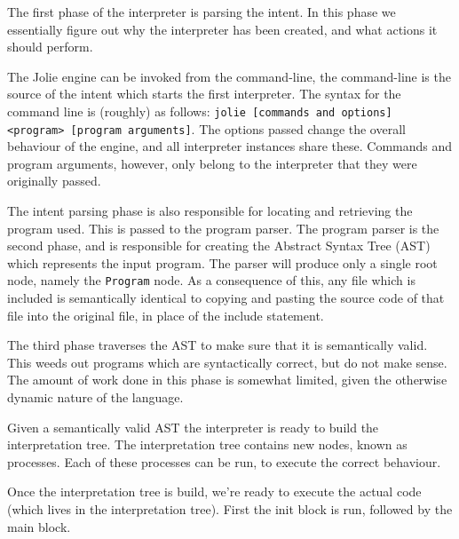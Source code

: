 The first phase of the interpreter is parsing the intent. In this phase we
essentially figure out why the interpreter has been created, and what actions
it should perform.

The Jolie engine can be invoked from the command-line, the command-line is the
source of the intent which starts the first interpreter. The syntax for the
command line is (roughly) as follows: \texttt{jolie [commands and
options] <program> [program arguments]}. The options passed change the
overall behaviour of the engine, and all interpreter instances share these.
Commands and program arguments, however, only belong to the interpreter that
they were originally passed.

The intent parsing phase is also responsible for locating and retrieving the
program used. This is passed to the program parser. The program parser is the
second phase, and is responsible for creating the Abstract Syntax Tree (AST)
which represents the input program. The parser will produce only a single root
node, namely the \verb!Program! node. As a consequence of this, any file which
is included is semantically identical to copying and pasting the source code of
that file into the original file, in place of the include statement.

The third phase traverses the AST to make sure that it is semantically valid.
This weeds out programs which are syntactically correct, but do not make sense.
The amount of work done in this phase is somewhat limited, given the otherwise
dynamic nature of the language.

Given a semantically valid AST the interpreter is ready to build the
interpretation tree. The interpretation tree contains new nodes, known as
processes. Each of these processes can be run, to execute the correct
behaviour.

Once the interpretation tree is build, we're ready to execute the actual code
(which lives in the interpretation tree). First the init block is run, followed
by the main block.
